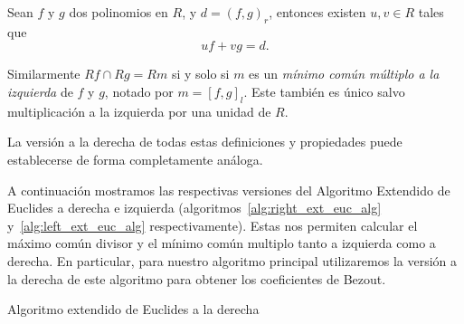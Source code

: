 \begin{proposition}
Sean \(f \text{ y } g\) dos polinomios en \(R\), y  \(d = {( f,g )_r}\), entonces existen \(u, v \in R\) tales que
\[
uf + vg = d
.\]
\end{proposition}

Similarmente  \(Rf \cap Rg = Rm\) si y solo si \(m\) es un \textit{mínimo común múltiplo a la izquierda} de \(f\) y \(g\), notado por \(m = {[f,g]}_l\). Este también es único salvo multiplicación a la izquierda por una unidad de \(R\).

La versión a la derecha de todas estas definiciones y propiedades puede establecerse de forma completamente análoga.

A continuación mostramos las respectivas versiones del Algoritmo Extendido de Euclides a derecha e izquierda (algoritmos~\ref{alg:right_ext_euc_alg} y~\ref{alg:left_ext_euc_alg} respectivamente). Estas nos permiten calcular el máximo común divisor y el mínimo común multiplo tanto a izquierda como a derecha.
En particular, para nuestro algoritmo principal utilizaremos la versión a la derecha de este algoritmo para obtener los coeficientes de Bezout.

\begin{algorithm}[H]\label{alg:right_ext_euc_alg}
 \caption{Algoritmo extendido de Euclides a la derecha}
\end{algorithm}

